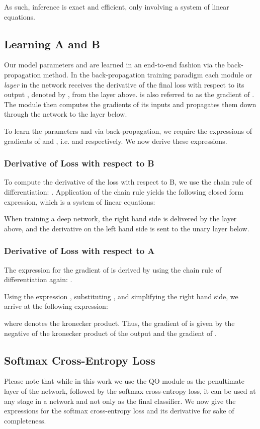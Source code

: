 \documentclass[runningheads]{llncs}
\begin{document}
As such, inference  is exact and efficient, only involving a system of linear equations.

\subsection{Learning A and B}
\label{subsec:learningAB}
Our model parameters  and  are learned in an end-to-end fashion via the back-propagation method.
In the back-propagation training paradigm each module or \emph{layer} in the network receives
the derivative of the final loss  with respect to its output , denoted by
, from the layer above.  is also referred to as the
gradient of . The module then computes the gradients of its inputs and propagates them down through the
network to the layer below.

To learn the parameters  and  via back-propagation, we require the expressions of gradients of  and , i.e.  and  respectively. We now derive these expressions.


\subsubsection{Derivative of Loss with respect to B}
\label{subsubsection:derivative_b}
To compute the derivative of the loss with respect to B, we use the chain rule of differentiation: .
Application of the chain rule yields the following closed form expression, which is a system of linear equations:

When training a deep network, the right hand side  is delivered by the layer above, and the derivative on the left hand side is sent to the unary layer below. 

\subsubsection{Derivative of Loss with respect to A}
The expression for the gradient of  is derived by using the chain rule of differentiation again: . 

Using the expression , substituting 
 ,
 and simplifying the right hand side,
 we arrive at the following expression:
 

where  denotes the kronecker product.
Thus, the gradient of  is given by the negative of the kronecker product of the output  and the gradient of .

\subsection{Softmax Cross-Entropy Loss}
Please note that while in this work we use the QO module as the penultimate layer of the network, followed by the
softmax cross-entropy loss, it can be used at any stage in a network and not only as the final classifier.
We now give the expressions for the softmax cross-entropy loss and its derivative for sake of completeness.
\end{document}
